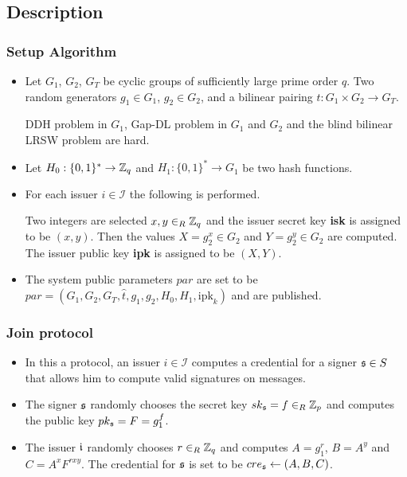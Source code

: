 \subsection{Description}
\subsubsection*{Setup Algorithm}
\begin{itemize}[align = left, leftmargin=*, label={--}]
\item Let $G_1$, $G_2$, $G_T$ be cyclic groups of sufficiently large prime order $q$. Two random generators $g_1 \in G_1$, $g_2 \in G_2$, and a bilinear pairing $\hat{t}: G_1 \times G_2 \rightarrow G_T$.

DDH problem in $G_1$, Gap-DL problem in $G_1$ and $G_2$ and the blind bilinear LRSW problem are hard.

\item Let $H_0 : \{0,1\}^\ast \rightarrow {\mathbb Z}_q$ and $H_1 : \{ 0 , 1 \}^\ast \rightarrow G_1$ be two hash functions.

\item For each issuer $i \in \mathcal{I}$ the following is performed.

Two integers are selected $x,y \in_R {\mathbb Z}_q$ and the issuer secret key \textbf{isk} is assigned to be $(x,y)$. Then the values $X = g_2^{x} \in G_2$ and $Y = g_2^{y} \in G_2$ are computed. The issuer public key \textbf{ipk} is assigned to be $(X,Y)$.

\item The system public parameters $par$ are set to be $par = (G_1, G_2, G_T, \hat{t}, g_1, g_2, H_0, H_1, \text{ipk}_k)$ and are published.
\end{itemize}

\subsubsection*{Join protocol}
\begin{itemize}[align = left, leftmargin=*, label={--}]
\item In this a protocol, an issuer $i \in \mathcal{I}$ computes a credential for a signer ${\mathfrak s} \in S$ that allows him to compute valid signatures on messages.

\item The signer ${\mathfrak s}$ randomly chooses the secret key $sk_{\mathfrak s} = f \in_R {\mathbb Z}_p$ and computes the public key $pk_{\mathfrak s} = F = g_1^f$.

\item The issuer ${\mathfrak i}$ randomly chooses $r \in_R {\mathbb Z}_q$ and computes $A = g_1^r$, $B = A^y$ and ${C = A^x F^{rxy}}$. The credential for ${\mathfrak s}$ is set to be $cre_{\mathfrak s} \leftarrow (A,B,C)$.
\end{itemize}

